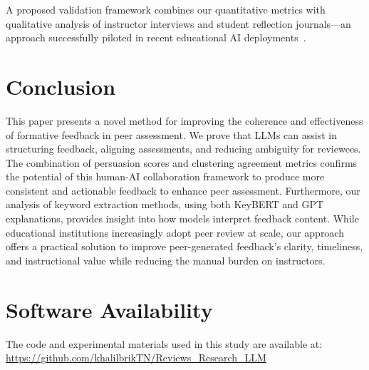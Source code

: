 \documentclass[manuscript,review, anonymous]{acmart}
\begin{document}
A proposed validation framework combines our quantitative metrics with qualitative analysis of instructor interviews and student reflection journals—an approach successfully piloted in recent educational AI deployments~\cite{openai2023gpt4}.



\section{Conclusion}
This paper presents a novel method for improving the coherence and effectiveness of formative feedback in peer assessment. We prove that LLMs can assist in structuring feedback, aligning assessments, and reducing ambiguity for reviewees. The combination of persuasion scores and clustering agreement metrics confirms the potential of this human-AI collaboration framework to produce more consistent and actionable feedback to enhance peer assessment. Furthermore, our analysis of keyword extraction methods, using both KeyBERT and GPT explanations, provides insight into how models interpret feedback content. While educational institutions increasingly adopt peer review at scale, our approach offers a practical solution to improve peer-generated feedback's clarity, timeliness, and instructional value while reducing the manual burden on instructors. 



\section*{Software Availability}

The code and experimental materials used in this study are available at:\\
\url{https://github.com/khalilbrikTN/Reviews_Research_LLM}





\end{document}
